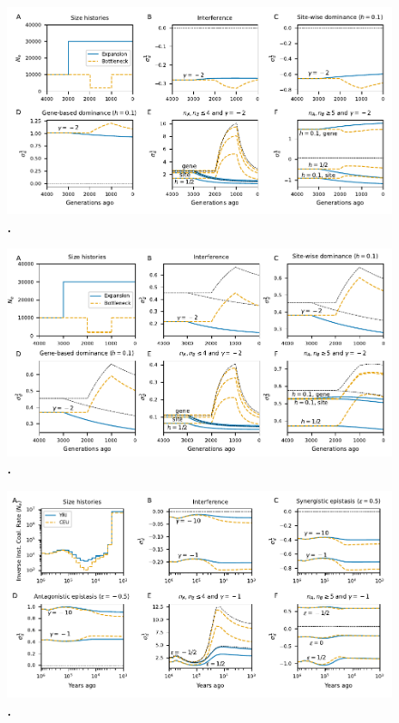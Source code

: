 \documentclass[]{article}
\begin{document}
\begin{figure}[ht!]
    \centering
    \includegraphics{../figures/demog_bottle_expand.dominance}
    \caption{
        \textbf{.}
    }
    \label{fig:toy_dom}
\end{figure}

\begin{figure}[ht!]
    \centering
    \includegraphics{../figures/demog_bottle_expand.dominance.sd2}
    \caption{
        \textbf{.}
    }
    \label{fig:toy_dom_sd2}
\end{figure}

\begin{figure}[ht!]
    \centering
    \includegraphics{../figures/demog_YRI_CEU}
    \caption{
        \textbf{.}
    }
    \label{fig:relate}
\end{figure}
\end{document}
